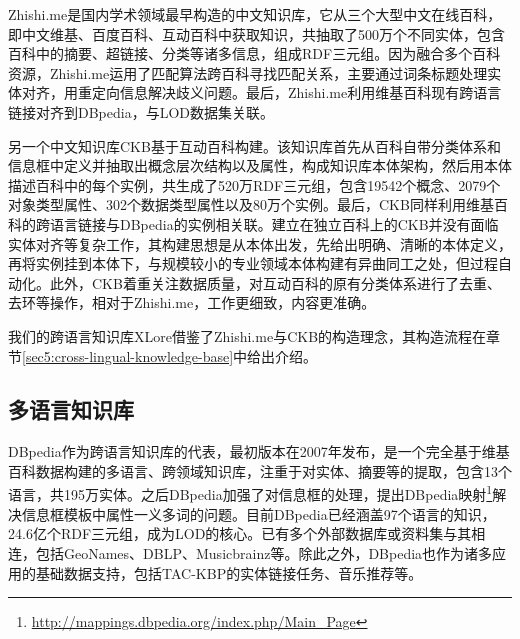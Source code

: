 Zhishi.me\cite{niu2011zhishi,wang2014publishing}是国内学术领域最早构造的中文知识库，它从三个大型中文在线百科，即中文维基、百度百科、互动百科中获取知识，共抽取了500万个不同实体，包含百科中的摘要、超链接、分类等诸多信息，组成RDF三元组。因为融合多个百科资源，Zhishi.me运用了匹配算法跨百科寻找匹配关系，主要通过词条标题处理实体对齐，用重定向信息解决歧义问题。最后，Zhishi.me利用维基百科现有跨语言链接对齐到DBpedia，与LOD数据集关联。

另一个中文知识库CKB\cite{wang2011building}基于互动百科构建。该知识库首先从百科自带分类体系和信息框中定义并抽取出概念层次结构以及属性，构成知识库本体架构，然后用本体描述百科中的每个实例，共生成了520万RDF三元组，包含19542个概念、2079个对象类型属性、302个数据类型属性以及80万个实例。最后，CKB同样利用维基百科的跨语言链接与DBpedia的实例相关联。建立在独立百科上的CKB并没有面临实体对齐等复杂工作，其构建思想是从本体出发，先给出明确、清晰的本体定义，再将实例挂到本体下，与规模较小的专业领域本体构建有异曲同工之处，但过程自动化。此外，CKB着重关注数据质量，对互动百科的原有分类体系进行了去重、去环等操作，相对于Zhishi.me，工作更细致，内容更准确。

我们的跨语言知识库XLore借鉴了Zhishi.me与CKB的构造理念，其构造流程在章节\ref{sec5:cross-lingual-knowledge-base}中给出介绍。

\subsection{多语言知识库}
DBpedia作为跨语言知识库的代表，最初版本在2007年发布\cite{auer2007dbpedia}，是一个完全基于维基百科数据构建的多语言、跨领域知识库，注重于对实体、摘要等的提取，包含13个语言，共195万实体。之后DBpedia加强了对信息框的处理，提出DBpedia映射\footnote{\url{http://mappings.dbpedia.org/index.php/Main_Page}}解决信息框模板中属性一义多词的问题。目前DBpedia已经涵盖97个语言的知识，24.6亿个RDF三元组，成为LOD的核心。已有多个外部数据库或资料集与其相连，包括GeoNames、DBLP、Musicbrainz等。除此之外，DBpedia也作为诸多应用的基础数据支持，包括TAC-KBP\cite{mendes2011evaluating}的实体链接任务、音乐推荐\cite{passant2010dbrec}等。


